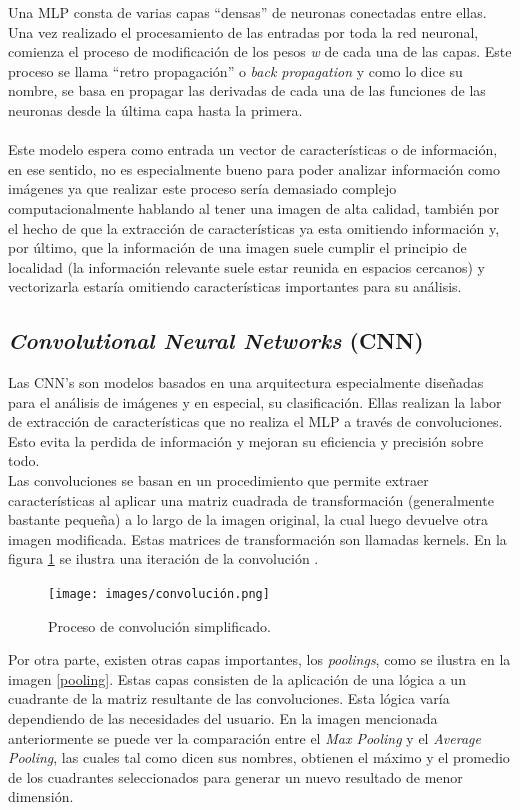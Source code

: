 Una MLP consta de varias capas ``densas'' de neuronas conectadas entre ellas. Una vez realizado el procesamiento de las entradas por toda la red neuronal, comienza el proceso de modificación de los pesos \textit{w} de cada una de las capas. Este proceso se llama ``retro propagación'' o \textit{back propagation} y como lo dice su nombre, se basa en propagar las derivadas de cada una de las funciones de las neuronas desde la última capa hasta la primera.\\\\
Este modelo espera como entrada un vector de características o de información, en ese sentido, no es especialmente bueno para poder analizar información como imágenes ya que realizar este proceso sería demasiado complejo computacionalmente hablando al tener una imagen de alta calidad, también por el hecho de que la extracción de características ya esta omitiendo información y, por último, que la información de una imagen suele cumplir el principio de localidad (la información relevante suele estar reunida en espacios cercanos) y vectorizarla estaría omitiendo características importantes para su análisis.

\subsection{\textit{Convolutional Neural Networks} (CNN)}

Las CNN's son modelos basados en una arquitectura  especialmente diseñadas para el análisis de imágenes y en especial, su clasificación. Ellas realizan la labor de extracción de características que no realiza el MLP a través de convoluciones. Esto evita la perdida de información y mejoran su eficiencia y precisión sobre todo. \\

Las convoluciones se basan en un procedimiento que permite extraer características al aplicar una matriz cuadrada de transformación (generalmente bastante pequeña) a lo largo de la imagen original, la cual luego devuelve otra imagen modificada. Estas matrices de transformación son llamadas kernels. En la figura \ref{convolucion} se ilustra una iteración de la convolución .

\begin{figure}[h!]
\texttt{[image: images/convolución.png]}
\centering
\caption{Proceso de convolución simplificado\protect\cite{convoluciones}.}
\label{convolucion}
\end{figure}

Por otra parte, existen otras capas importantes, los \textit{poolings}, como se ilustra en la imagen \ref{pooling}. Estas capas consisten de la aplicación de una lógica a un cuadrante de la matriz resultante de las convoluciones. Esta lógica varía dependiendo de las necesidades del usuario. En la imagen mencionada anteriormente se puede ver la comparación entre el \textit{Max Pooling} y el \textit{Average Pooling}, las cuales tal como dicen sus nombres, obtienen el máximo y el promedio de los cuadrantes seleccionados para generar un nuevo resultado de menor dimensión. 

